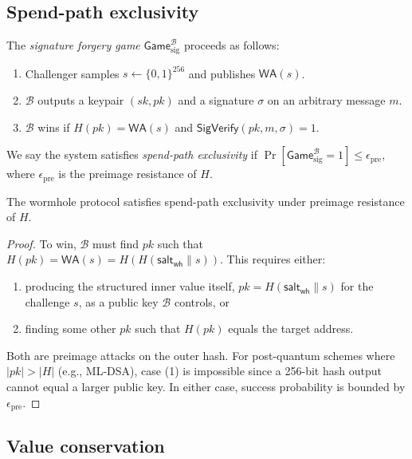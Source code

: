 \documentclass{iacrcc}
\newcommand{\WA}{\mathsf{WA}}
\begin{document}
\subsection{Spend-path exclusivity}

\begin{definition}
The \emph{signature forgery game} \(\mathsf{Game}_{\mathrm{sig}}^{\mathcal{B}}\) proceeds as follows:
\begin{enumerate}
    \item Challenger samples \(s \gets \{0,1\}^{256}\) and publishes \(\WA(s)\).
    \item \(\mathcal{B}\) outputs a keypair \((sk, pk)\) and a signature \(\sigma\) on an arbitrary message \(m\).
    \item \(\mathcal{B}\) wins if \(H(pk) = \WA(s)\) and \(\mathsf{SigVerify}(pk, m, \sigma) = 1\).
\end{enumerate}
We say the system satisfies \emph{spend-path exclusivity} if \(\Pr[\mathsf{Game}_{\mathrm{sig}}^{\mathcal{B}} = 1] \leq \epsilon_{\mathrm{pre}}\), where \(\epsilon_{\mathrm{pre}}\) is the preimage resistance of \(H\).
\end{definition}

\begin{theorem}
The wormhole protocol satisfies spend-path exclusivity under preimage resistance of \(H\).
\end{theorem}

\begin{proof}
To win, \(\mathcal{B}\) must find \(pk\) such that \(H(pk) = \WA(s) = H(H(\mathsf{salt_{wh}} \parallel s))\). This requires either:
\begin{enumerate}
    \item producing the structured inner value itself, \(pk = H(\mathsf{salt_{wh}} \parallel s)\) for the challenge \(s\), as a public key \(\mathcal{B}\) controls, or
    \item finding some other \(pk\) such that \(H(pk)\) equals the target address.
\end{enumerate}
Both are preimage attacks on the outer hash. For post-quantum schemes where \(|pk| > |H|\) (e.g., ML-DSA), case (1) is impossible since a 256-bit hash output cannot equal a larger public key. In either case, success probability is bounded by \(\epsilon_{\mathrm{pre}}\).
\end{proof}

\subsection{Value conservation}
\end{document}
